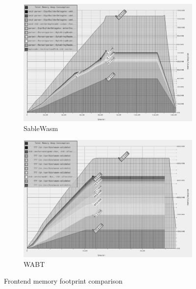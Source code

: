 \begin{figure}
  \centering
  \begin{subfigure}[t]{0.87\textwidth}
    \includegraphics[width=\textwidth]{Images/sablewasm-validate-memory-grayscale.png}
    \caption{SableWasm}\label{fig:sablewasm-eval-memory-sablewasm}
  \end{subfigure}
  \begin{subfigure}[t]{0.87\textwidth}
    \includegraphics[width=\textwidth]{Images/wabt-validate-memory-grayscale.png}
    \caption{WABT}\label{fig:sablewasm-eval-memory-wabt}
  \end{subfigure}
  \caption{Frontend memory footprint comparison}
  \label{fig:sablewasm-eval-memory}
\end{figure}

